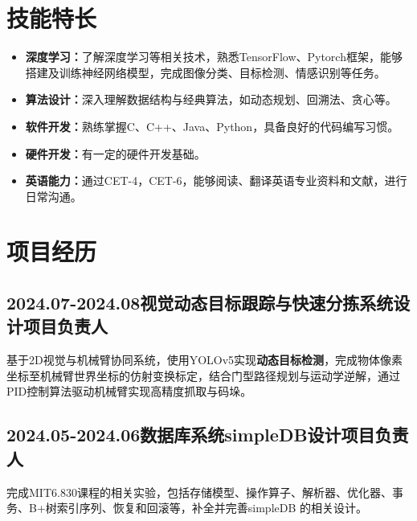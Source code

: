 \documentclass[11pt]{article}
\begin{document}
    \section{\makebox[\widthof{\faStar}][c]{\color{NPU_Blue}{\faStar}}\quad 技能特长}  
    \vspace{0.5em}
    \begin{itemize}
    \setlength{\itemsep}{0pt}  %
    \setlength{\parsep}{0pt}   %
    \setlength{\parskip}{0pt}  %
        \item \textbf{深度学习：}了解深度学习等相关技术，熟悉TensorFlow、Pytorch框架，能够搭建及训练神经网络模型，完成图像分类、目标检测、情感识别等任务。
        \item \textbf{算法设计：}深入理解数据结构与经典算法，如动态规划、回溯法、贪心等。
        \item \textbf{软件开发：}熟练掌握C、C++、Java、Python，具备良好的代码编写习惯。
        \item \textbf{硬件开发：}有一定的硬件开发基础。
        \item \textbf{英语能力：}通过CET-4，CET-6，能够阅读、翻译英语专业资料和文献，进行日常沟通。
    \end{itemize}
    
    \vspace{-1.3em}

    \section{\makebox[\widthof{\faLaptop}][c]{\color{NPU_Blue}{\faLaptop}}\quad 项目经历}
    \vspace{0.5em}               
        \subsection{2024.07-2024.08\hfill 视觉动态目标跟踪与快速分拣系统设计\hfill 项目负责人}
        \vspace{-0.5em} 
        \hspace{2em}基于2D视觉与机械臂协同系统，使用YOLOv5实现\textbf{动态目标检测}，完成物体像素坐标至机械臂世界坐标的仿射变换标定，结合门型路径规划与运动学逆解，通过PID控制算法驱动机械臂实现高精度抓取与码垛。          
        \subsection{2024.05-2024.06\hfill 数据库系统simpleDB设计\hfill 项目负责人}
        \vspace{-0.5em} 
        \hspace{2em}完成MIT6.830课程的相关实验，包括存储模型、操作算子、解析器、优化器、事务、B+树索引序列、恢复和回滚等，补全并完善simpleDB 的相关设计。
\end{document}

